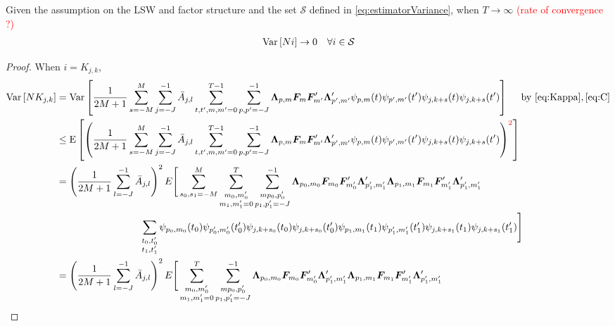 \documentclass[main_document.tex]{subfiles}
\begin{document}
\begin{lemma}\label{lem:lemma2}
	Given the assumption on the LSW and factor structure and the set $\mathcal{S}$ defined in \eqref{eq:estimatorVariance}, when $T \to \infty$ \textcolor{red}{(rate of convergence ?)}
	\begin{align*}
		\mathrm{Var}\left[N i\right] \to 0 \quad \forall i \in \mathcal{S}
	\end{align*}
\end{lemma}
\begin{proof}
When $i = K_{j,k}$, 
	\begin{align*}
		\Var{N K_{j,k}} &= \Var{\frac{\displaystyle 1}{\displaystyle 2M+1}\sum_{s=-M}^{M} \scalesum{j} \invA{j}{l} \locsum{t,t',m,m'} \scalesum{p,p'} \loadings{p}{m} \factors{m}\factors{m'}' \loadings{p'}{m'}' \wavelet{p}{m}{t}\wavelet{p'}{m'}{t'}\wavelet{j}{k+s}{t}\wavelet{j}{k+s}{t'}} \quad \text{ by } \eqref{eq:Kappa}, \eqref{eq:C}\\
				    &\leq \E{\left(\frac{\displaystyle 1}{\displaystyle 2M+1}\sum_{s=-M}^{M} \scalesum{j} \invA{j}{l} \locsum{t,t',m,m'} \scalesum{p,p'} \loadings{p}{m} \factors{m}\factors{m'}' \loadings{p'}{m'}' \wavelet{p}{m}{t}\wavelet{p'}{m'}{t'}\wavelet{j}{k+s}{t}\wavelet{j}{k+s}{t'}\right)^{\textcolor{red}{2}}} \\
				    &= \left( \frac{\displaystyle 1}{\displaystyle 2M+1} \scalesum{l}\invA{j}{l} \right)^{2} E \Bigg [ \sum_{s_0,s_1 = -M}^{M} \sum_{\substack{m_0,m_0' \\ m_1,m_1'=0}}^{T}\sum_{\substack{mp_0,p_0' \\ p_1,p_1'=-J}}^{-1}\loadings{p_0}{m_0}\factors{m_0}\factors{m_0'}' \loadings{p_1'}{m_1'}'\loadings{p_1}{m_1}\factors{m_1}\factors{m_1'}' \loadings{p_1'}{m_1'}' \\
	 & \hspace{3cm} \sum_{\substack{t_0,t_0' \\ t_1,t_1'}} \wavelet{p_0}{m_0}{t_0}\wavelet{p_0'}{m_0'}{t_0'}\wavelet{j}{k+s_0}{t_0}\wavelet{j}{k+s_0}{t_0'}\wavelet{p_1}{m_1}{t_1}\wavelet{p_1'}{m_1'}{t_1'}\wavelet{j}{k+s_1}{t_1}\wavelet{j}{k+s_1}{t_1'} \Bigg ]\\
	&= \left( \frac{\displaystyle 1}{\displaystyle 2M+1} \scalesum{l}\invA{j}{l} \right)^{2} E \Bigg [ \sum_{\substack{m_0,m_0' \\ m_1,m_1'=0}}^{T}\sum_{\substack{mp_0,p_0' \\ p_1,p_1'=-J}}^{-1}\loadings{p_0}{m_0}\factors{m_0}\factors{m_0'}' \loadings{p_1'}{m_1'}'\loadings{p_1}{m_1}\factors{m_1}\factors{m_1'}' \loadings{p_1'}{m_1'}' \\

\end{align*}
\end{proof}
\end{document}
